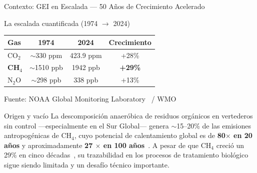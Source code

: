 \documentclass[aspectratio=169, 11pt]{beamer}
\begin{document}
\begin{frame}{Contexto: GEI en Escalada --- 50 A\~{n}os de Crecimiento Acelerado}

\begin{block}{La escalada cuantificada (1974 $\rightarrow$ 2024)}
\centering
\begin{tabular}{lccc}
\toprule
\textbf{Gas} & \textbf{1974} & \textbf{2024} & \textbf{Crecimiento} \\
\midrule
CO$_2$  & $\sim$330 ppm  & 423.9 ppm & +28\% \\
\textbf{CH$_4$}  & $\sim$1510 ppb & 1942 ppb  & \textbf{+29\%} \\
N$_2$O  & $\sim$298 ppb  & 338 ppb   & +13\% \\
\bottomrule
\end{tabular}

\vspace{0.2cm}
\footnotesize Fuente: NOAA Global Monitoring Laboratory~\cite{noaa2024ch4} / WMO~\cite{ak-bhdWEATHERCLIMATEWATER}
\end{block}


\begin{alertblock}{Origen y vac\'io}
\footnotesize
La descomposici\'on anaer\'obica de residuos org\'anicos en vertederos sin control 
---especialmente en el Sur Global--- genera $\sim$15--20\% de las emisiones 
antropog\'enicas de CH$_4$, cuyo potencial de calentamiento global es de 
\textbf{80$\times$ en 20 a\~nos} y aproximadamente \textbf{27 $\times$ en 100 a\~nos}~\cite{intergovernmentalpanelonclimatechangeipccClimateChange20212023}. 
A pesar de que CH$_4$ creci\'o un 29\% en cinco d\'ecadas~\cite{ak-bhdWEATHERCLIMATEWATER}, 
su trazabilidad en los procesos de tratamiento biol\'ogico sigue siendo limitada y un desafío técnico importante.
\end{alertblock}

\end{frame}
\end{document}
